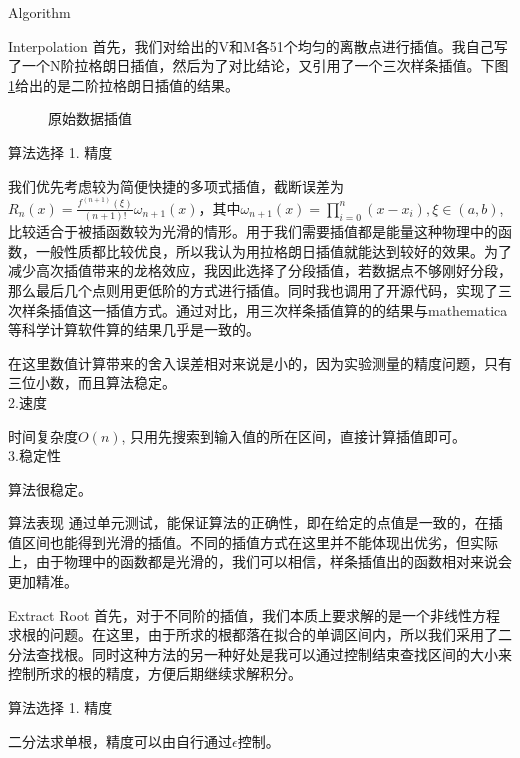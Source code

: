 \documentclass[letterpaper,12pt]{article}
\begin{document}
\begin{section}{Algorithm}
	\begin{subsection}{Interpolation}
		首先，我们对给出的V和M各51个均匀的离散点进行插值。我自己写了一个N阶拉格朗日插值，然后为了对比结论，又引用了一个三次样条插值。下图\ref{p1}给出的是二阶拉格朗日插值的结果。
	 \begin{figure}[!htbp]
		\begin{center}
			
		\end{center}
		\label{p1}
		\caption{原始数据插值}
	 \end{figure}
	 	\begin{subsubsection}{算法选择}
	 		1. 精度\par
	 		我们优先考虑较为简便快捷的多项式插值，截断误差为$R_n(x)=\frac{f^{(n+1)}(\xi)}{(n+1)!}\omega_{n+1}(x)$，其中$\omega_{n+1}(x)=\prod\limits^n_{i=0}(x-x_i),\xi\in (a,b)$, 比较适合于被插函数较为光滑的情形。用于我们需要插值都是能量这种物理中的函数，一般性质都比较优良，所以我认为用拉格朗日插值就能达到较好的效果。为了减少高次插值带来的龙格效应，我因此选择了分段插值，若数据点不够刚好分段，那么最后几个点则用更低阶的方式进行插值。同时我也调用了开源代码，实现了三次样条插值这一插值方式。通过对比，用三次样条插值算的的结果与mathematica等科学计算软件算的结果几乎是一致的。\par

	 		在这里数值计算带来的舍入误差相对来说是小的，因为实验测量的精度问题，只有三位小数，而且算法稳定。\\

	 		2.速度\par
	 		时间复杂度$O(n)$, 只用先搜索到输入值的所在区间，直接计算插值即可。\\

	 		3.稳定性\par
	 		算法很稳定。\\

	 	\end{subsubsection}

	 	\begin{subsubsection}{算法表现}
	 		通过单元测试，能保证算法的正确性，即在给定的点值是一致的，在插值区间也能得到光滑的插值。不同的插值方式在这里并不能体现出优劣，但实际上，由于物理中的函数都是光滑的，我们可以相信，样条插值出的函数相对来说会更加精准。
	 	\end{subsubsection}

	 \end{subsection}
	\begin{subsection}{Extract Root}
		首先，对于不同阶的插值，我们本质上要求解的是一个非线性方程求根的问题。在这里，由于所求的根都落在拟合的单调区间内，所以我们采用了二分法查找根。同时这种方法的另一种好处是我可以通过控制结束查找区间的大小来控制所求的根的精度，方便后期继续求解积分。
	 	\begin{subsubsection}{算法选择}
	 		1. 精度\par
	 		二分法求单根，精度可以由自行通过$\epsilon$控制。\\


\end{subsubsection}
\end{subsection}
\end{section}
\end{document}
